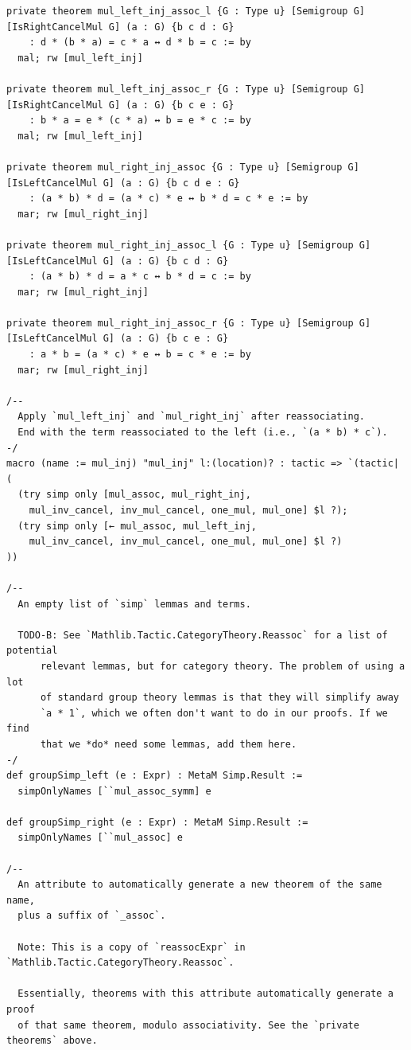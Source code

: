 \documentclass[10pt,a4paper]{article}
\begin{document}
\begin{Verbatim}
private theorem mul_left_inj_assoc_l {G : Type u} [Semigroup G] [IsRightCancelMul G] (a : G) {b c d : G}
    : d * (b * a) = c * a ↔ d * b = c := by
  mal; rw [mul_left_inj]

private theorem mul_left_inj_assoc_r {G : Type u} [Semigroup G] [IsRightCancelMul G] (a : G) {b c e : G}
    : b * a = e * (c * a) ↔ b = e * c := by
  mal; rw [mul_left_inj]

private theorem mul_right_inj_assoc {G : Type u} [Semigroup G] [IsLeftCancelMul G] (a : G) {b c d e : G}
    : (a * b) * d = (a * c) * e ↔ b * d = c * e := by
  mar; rw [mul_right_inj]

private theorem mul_right_inj_assoc_l {G : Type u} [Semigroup G] [IsLeftCancelMul G] (a : G) {b c d : G}
    : (a * b) * d = a * c ↔ b * d = c := by
  mar; rw [mul_right_inj]

private theorem mul_right_inj_assoc_r {G : Type u} [Semigroup G] [IsLeftCancelMul G] (a : G) {b c e : G}
    : a * b = (a * c) * e ↔ b = c * e := by
  mar; rw [mul_right_inj]

/--
  Apply `mul_left_inj` and `mul_right_inj` after reassociating.
  End with the term reassociated to the left (i.e., `(a * b) * c`).
-/
macro (name := mul_inj) "mul_inj" l:(location)? : tactic => `(tactic| (
  (try simp only [mul_assoc, mul_right_inj,
    mul_inv_cancel, inv_mul_cancel, one_mul, mul_one] $l ?);
  (try simp only [← mul_assoc, mul_left_inj,
    mul_inv_cancel, inv_mul_cancel, one_mul, mul_one] $l ?)
))

/--
  An empty list of `simp` lemmas and terms.

  TODO-B: See `Mathlib.Tactic.CategoryTheory.Reassoc` for a list of potential
      relevant lemmas, but for category theory. The problem of using a lot
      of standard group theory lemmas is that they will simplify away
      `a * 1`, which we often don't want to do in our proofs. If we find
      that we *do* need some lemmas, add them here.
-/
def groupSimp_left (e : Expr) : MetaM Simp.Result :=
  simpOnlyNames [``mul_assoc_symm] e

def groupSimp_right (e : Expr) : MetaM Simp.Result :=
  simpOnlyNames [``mul_assoc] e

/--
  An attribute to automatically generate a new theorem of the same name,
  plus a suffix of `_assoc`.

  Note: This is a copy of `reassocExpr` in `Mathlib.Tactic.CategoryTheory.Reassoc`.

  Essentially, theorems with this attribute automatically generate a proof
  of that same theorem, modulo associativity. See the `private theorems` above.


\end{Verbatim}
\end{document}
